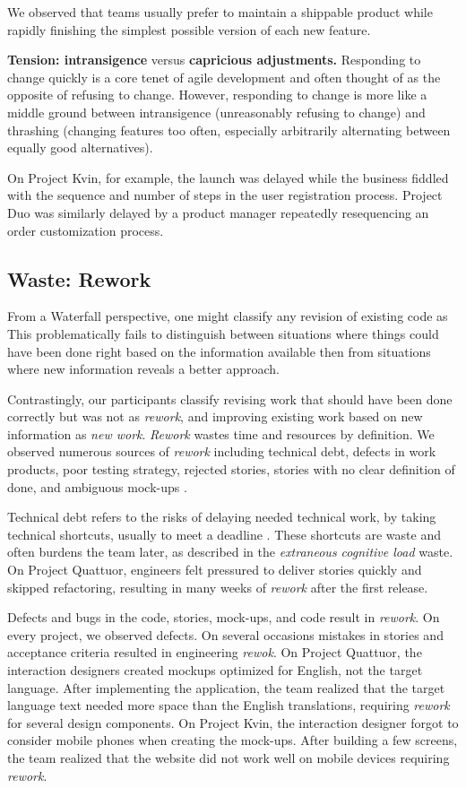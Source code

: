 We observed that teams usually prefer to maintain a shippable product while rapidly finishing the simplest possible version of each new feature.

\textbf{Tension: intransigence} versus \textbf{capricious adjustments.}
Responding to change quickly is a core tenet of agile development and often thought of as the opposite of refusing to change. However, responding to change is more like a middle ground between intransigence (unreasonably refusing to change) and thrashing (changing features too often, especially arbitrarily alternating between equally good alternatives). 

On Project Kvin, for example, the launch was delayed while the business fiddled with the sequence and number of steps in the user registration process. Project Duo was similarly delayed by a product manager repeatedly resequencing an order customization process. 
\subsection{Waste: Rework}
From a Waterfall perspective, one might classify any revision of existing code as  This problematically fails to distinguish between situations where things could have been done right based on the information available then from situations where new information reveals a better approach. 

Contrastingly, our participants classify revising work that should have been done correctly but was not as \textit{rework}, and improving existing work based on new information as \textit{new work}. \textit{Rework} wastes time and resources by definition. We observed numerous sources of \textit{rework} including technical debt, defects in work products, poor testing strategy, rejected stories, stories with no clear definition of done, and ambiguous mock-ups .
 
Technical debt refers to the risks of delaying needed technical work, by taking technical shortcuts, usually to meet a deadline \cite{McConnellTechnicalDebt}. These shortcuts are waste and often burdens the team later, as described in the \textit{extraneous cognitive load} waste. On Project Quattuor, engineers felt pressured to deliver stories quickly and skipped refactoring, resulting in many weeks of \textit{rework} after the first release. 

Defects and bugs in the code, stories, mock-ups, and code result in \textit{rework}. On every project, we observed defects. On several occasions mistakes in stories and acceptance criteria resulted in engineering \textit{rewok}. On Project Quattuor, the interaction designers created mockups optimized for English, not the target language. After implementing the application, the team realized that the target language text needed more space than the English translations, requiring \textit{rework} for several design components. On Project Kvin, the interaction designer forgot to consider mobile phones when creating the mock-ups. After building a few screens, the team realized that the website did not work well on mobile devices requiring \textit{rework}.

